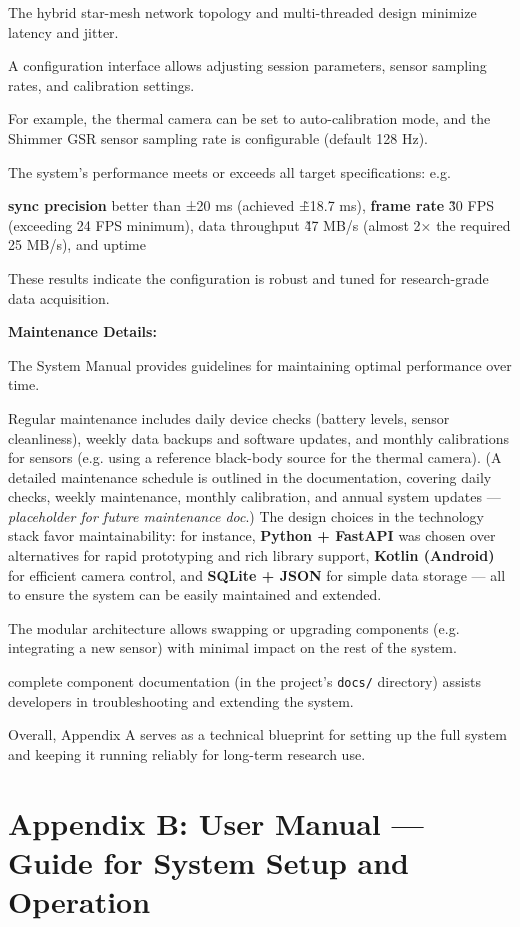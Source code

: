 The hybrid star-mesh network topology and multi-threaded design minimize latency and jitter.

A configuration interface allows adjusting session parameters, sensor sampling rates, and calibration settings.

For example, the thermal camera can be set to auto-calibration mode, and the Shimmer GSR sensor sampling rate is configurable (default 128 Hz).

The system's performance meets or exceeds all target specifications: e.g.

\textbf{sync precision}
 better than ±20 ms (achieved \~±18.7 ms), \textbf{frame rate}
 \~30 FPS (exceeding 24 FPS minimum), data throughput \~47 MB/s (almost 2× the required 25 MB/s), and uptime %

These results indicate the configuration is robust and tuned for research-grade data acquisition.

\textbf{Maintenance Details:}

The System Manual provides guidelines for maintaining optimal performance over time.

Regular maintenance includes daily device checks (battery levels, sensor cleanliness), weekly data backups and software updates, and monthly calibrations for sensors (e.g. using a reference black-body source for the thermal camera). (A detailed maintenance schedule is outlined in the documentation, covering daily checks, weekly maintenance, monthly calibration, and annual system updates --- \textit{placeholder for future maintenance doc}.) The design choices in the technology stack favor maintainability: for instance, \textbf{Python + FastAPI}
 was chosen over alternatives for rapid prototyping and rich library support, \textbf{Kotlin (Android)}
 for efficient camera control, and \textbf{SQLite + JSON}
 for simple data storage --- all to ensure the system can be easily maintained and extended.

The modular architecture allows swapping or upgrading components (e.g. integrating a new sensor) with minimal impact on the rest of the system.

complete component documentation (in the project's \texttt{docs/} directory) assists developers in troubleshooting and extending the system.

Overall, Appendix A serves as a technical blueprint for setting up the full system and keeping it running reliably for long-term research use.

\section{Appendix B: User Manual --- Guide for System Setup and Operation}


